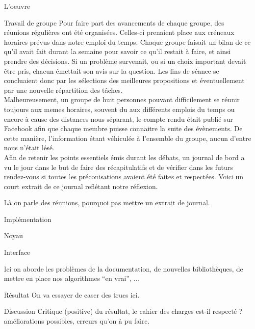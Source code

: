 \documentclass[a4paper, 12pt]{report}
\begin{document}
	\begin{part}{L'oeuvre}
		\begin{chapter}{Travail de groupe}
		Pour faire part des avancements de chaque groupe, des réunions régulières ont été organisées. 
		Celles-ci prenaient place aux créneaux horaires prévus dans notre emploi du temps. 
		Chaque groupe faisait un bilan de ce qu'il avait fait durant la semaine pour savoir ce qu'il restait à faire, et ainsi prendre des décisions.
		Si un problème survenait, ou si un choix important devait être pris, chacun	émettait son avis sur la question.
		Les fins de séance se concluaient donc par les sélections des meilleures propositions et éventuellement par	une nouvelle répartition 
		des tâches.\\
		Malheureusement, un groupe de huit personnes pouvant difficilement se réunir toujours aux memes horaires, 
		souvent du aux différents emplois du temps ou encore à cause des distances nous séparant, le compte rendu était publié sur Facebook 
		afin que chaque membre puisse connaitre la suite des évènements. 
		De cette manière, l'information étant véhiculée à l'ensemble du groupe, aucun d'entre nous n'était lésé.\\
		Afin de retenir les points essentiels émis durant les débats, un journal de bord a vu le jour dans le but de faire des récapitulatifs 
		et de vérifier dans les futurs rendez-vous si toutes les préconisations avaient été faites et respectées. 
		Voici un court extrait de ce journal reflétant notre réflexion.
		
					
			Là on parle des réunions, pourquoi pas mettre un extrait de journal.
		\end{chapter}
		\begin{chapter}{Implémentation}
			\begin{section}{Noyau}
			\end{section}
			\begin{section}{Interface}
			\end{section}
			Ici on aborde les problèmes de la documentation, de nouvelles bibliothèques, de mettre en place nos algorithmes ``en vrai'', ... 
		\end{chapter}
		\begin{chapter}{Résultat}
			On va essayer de caser des trucs ici.
		\end{chapter}
		\begin{chapter}{Discussion}
			Critique (positive) du résultat, le cahier des charges est-il respecté ? améliorations possibles, erreurs qu'on à pu faire.
		\end{chapter}
	\end{part}
\end{document}
